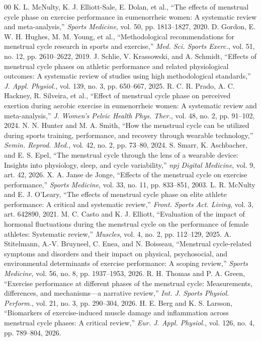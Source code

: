 \documentclass[conference]{IEEEtran}
\begin{document}
\begin{thebibliography}{00}
 K. L. McNulty, K. J. Elliott-Sale, E. Dolan, et al., ``The effects of menstrual cycle phase on exercise performance in eumenorrheic women: A systematic review and meta-analysis,'' \emph{Sports Medicine}, vol. 50, pp. 1813--1827, 2020.
 D. Gordon, E. W. H. Hughes, M. M. Young, et al., ``Methodological recommendations for menstrual cycle research in sports and exercise,'' \emph{Med. Sci. Sports Exerc.}, vol. 51, no. 12, pp. 2610--2622, 2019.
 J. Schlie, V. Krassowski, and A. Schmidt, ``Effects of menstrual cycle phases on athletic performance and related physiological outcomes: A systematic review of studies using high methodological standards,'' \emph{J. Appl. Physiol.}, vol. 139, no. 3, pp. 650--667, 2025.
 R. C. R. Prado, A. C. Hackney, R. Silveira, et al., ``Effect of menstrual cycle phase on perceived exertion during aerobic exercise in eumenorrheic women: A systematic review and meta-analysis,'' \emph{J. Women's Pelvic Health Phys. Ther.}, vol. 48, no. 2, pp. 91--102, 2024.
 N. N. Hunter and M. A. Smith, ``How the menstrual cycle can be utilized during sports training, performance, and recovery through wearable technology,'' \emph{Semin. Reprod. Med.}, vol. 42, no. 2, pp. 73--80, 2024.
 S. Smarr, K. Aschbacher, and E. S. Epel, ``The menstrual cycle through the lens of a wearable device: Insights into physiology, sleep, and cycle variability,'' \emph{npj Digital Medicine}, vol. 9, art. 42, 2026.
 X. A. Janse de Jonge, ``Effects of the menstrual cycle on exercise performance,'' \emph{Sports Medicine}, vol. 33, no. 11, pp. 833--851, 2003.
 L. R. McNulty and E. J. O'Leary, ``The effects of menstrual cycle phase on elite athlete performance: A critical and systematic review,'' \emph{Front. Sports Act. Living}, vol. 3, art. 642890, 2021.
 M. C. Casto and K. J. Elliott, ``Evaluation of the impact of hormonal fluctuations during the menstrual cycle on the performance of female athletes: Systematic review,'' \emph{Muscles}, vol. 4, no. 2, pp. 112--129, 2025.
 A. Stitelmann, A.-V. Bruyneel, C. Enea, and N. Boisseau, ``Menstrual cycle-related symptoms and disorders and their impact on physical, psychosocial, and environmental determinants of exercise performance: A scoping review,'' \emph{Sports Medicine}, vol. 56, no. 8, pp. 1937--1953, 2026.
 R. H. Thomas and P. A. Green, ``Exercise performance at different phases of the menstrual cycle: Measurements, differences, and mechanisms---a narrative review,'' \emph{Int. J. Sports Physiol. Perform.}, vol. 21, no. 3, pp. 290--304, 2026.
 H. E. Berg and K. S. Larsson, ``Biomarkers of exercise-induced muscle damage and inflammation across menstrual cycle phases: A critical review,'' \emph{Eur. J. Appl. Physiol.}, vol. 126, no. 4, pp. 789--804, 2026.
\end{thebibliography}
\end{document}
